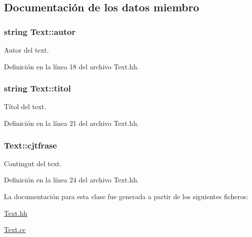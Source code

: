 \subsection{Documentación de los datos miembro}
\subsubsection[{\texorpdfstring{autor}{autor}}]{\setlength{\rightskip}{0pt plus 5cm}string Text\+::autor\hspace{0.3cm}{\ttfamily [private]}}\hypertarget{class_text_ad8f978ad7d2735c371990cce7bdc0d8f}{}\label{class_text_ad8f978ad7d2735c371990cce7bdc0d8f}


Autor del text. 



Definición en la línea 18 del archivo Text.\+hh.

\subsubsection[{\texorpdfstring{titol}{titol}}]{\setlength{\rightskip}{0pt plus 5cm}string Text\+::titol\hspace{0.3cm}{\ttfamily [private]}}\hypertarget{class_text_abebeee870d4c29258cd1641b0e5f0947}{}\label{class_text_abebeee870d4c29258cd1641b0e5f0947}


Títol del text. 



Definición en la línea 21 del archivo Text.\+hh.

\subsubsection[{\texorpdfstring{cjtfrase}{cjtfrase}}]{ Text\+::cjtfrase\hspace{0.3cm}{\ttfamily [private]}}\hypertarget{class_text_a61609677a5dab23e37398e796f41f061}{}\label{class_text_a61609677a5dab23e37398e796f41f061}


Contingut del text. 



Definición en la línea 24 del archivo Text.\+hh.



La documentación para esta clase fue generada a partir de los siguientes ficheros\+:\begin{DoxyCompactItemize}
\item 
\hyperlink{_text_8hh}{Text.\+hh}\item 
\hyperlink{_text_8cc}{Text.\+cc}\end{DoxyCompactItemize}
